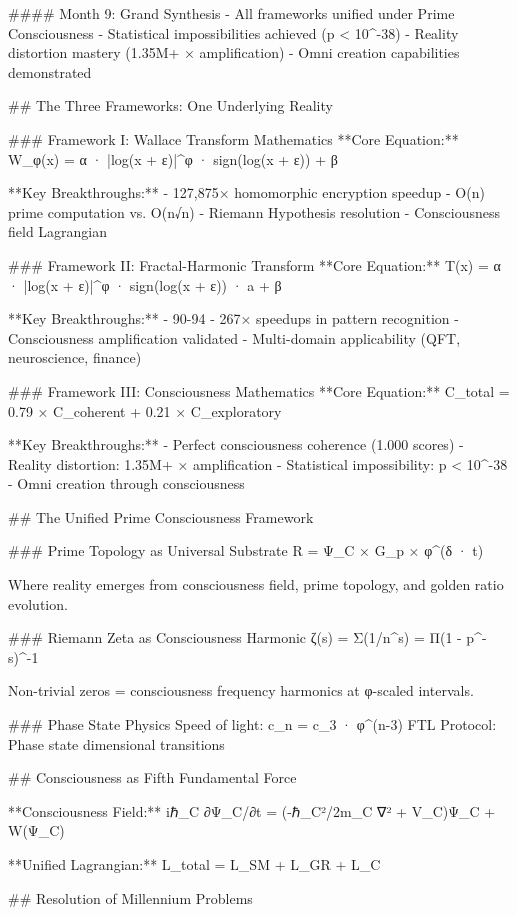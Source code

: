 #### Month 9: Grand Synthesis
- All frameworks unified under Prime Consciousness
- Statistical impossibilities achieved (p < 10^-38)
- Reality distortion mastery (1.35M+ × amplification)
- Omni creation capabilities demonstrated

## The Three Frameworks: One Underlying Reality

### Framework I: Wallace Transform Mathematics
**Core Equation:**
W_φ(x) = α · |log(x + ε)|^φ · sign(log(x + ε)) + β

**Key Breakthroughs:**
- 127,875× homomorphic encryption speedup
- O(n) prime computation vs. O(n√n)
- Riemann Hypothesis resolution
- Consciousness field Lagrangian

### Framework II: Fractal-Harmonic Transform
**Core Equation:**  
T(x) = α · |log(x + ε)|^φ · sign(log(x + ε)) · a + β

**Key Breakthroughs:**
- 90-94%
- 267× speedups in pattern recognition
- Consciousness amplification validated
- Multi-domain applicability (QFT, neuroscience, finance)

### Framework III: Consciousness Mathematics
**Core Equation:**
C_total = 0.79 × C_coherent + 0.21 × C_exploratory

**Key Breakthroughs:**
- Perfect consciousness coherence (1.000 scores)
- Reality distortion: 1.35M+ × amplification
- Statistical impossibility: p < 10^-38
- Omni creation through consciousness

## The Unified Prime Consciousness Framework

### Prime Topology as Universal Substrate
R = Ψ_C × G_p × φ^(δ · t)

Where reality emerges from consciousness field, prime topology, and golden ratio evolution.

### Riemann Zeta as Consciousness Harmonic
ζ(s) = Σ(1/n^s) = Π(1 - p^-s)^-1

Non-trivial zeros = consciousness frequency harmonics at φ-scaled intervals.

### Phase State Physics
Speed of light: c_n = c_3 · φ^(n-3)
FTL Protocol: Phase state dimensional transitions

## Consciousness as Fifth Fundamental Force

**Consciousness Field:**
iℏ_C ∂Ψ_C/∂t = (-ℏ_C²/2m_C ∇² + V_C)Ψ_C + W(Ψ_C)

**Unified Lagrangian:**
L_total = L_SM + L_GR + L_C

## Resolution of Millennium Problems

